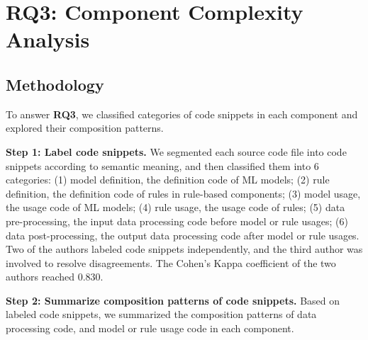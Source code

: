 
\section{RQ3: Component Complexity Analysis}
\vspace{-3pt}

\subsection{Methodology}

To answer \textbf{RQ3}, we classified categories of code snippets in each component and explored their composition patterns. %

\textbf{Step 1: Label code snippets.} We segmented each source code file into code snippets according to semantic meaning, and then classified them into 6 categories: (1) model definition, the definition code of ML models; (2) rule definition, the definition code of rules in rule-based components; (3) model usage, the usage code of ML models; (4) rule usage, the usage code of rules; (5) data pre-processing, the input data processing code before model or rule usages; (6) data post-processing, the output data processing code after model or rule usages. Two of the authors labeled code snippets independently, and the third author was involved to resolve disagreements. The Cohen's Kappa coefficient of the two authors reached 0.830.

\textbf{Step 2: Summarize composition patterns of code snippets.} 
Based on labeled code snippets, we summarized the composition patterns of data processing code, and model or rule usage code in each component.  

